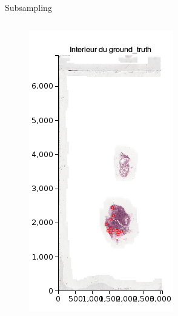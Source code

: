 \documentclass{beamer}
\begin{document}
\begin{frame}[noframenumbering]{Subsampling}

\begin{columns}[T] %
\begin{column}{.25\textwidth}
\begin{figure}[!ht]
\centering
\includegraphics[width=\textwidth]{OnlyPositive.png}

\end{figure}
\end{column}
\end{columns}
\end{frame}
\end{document}
